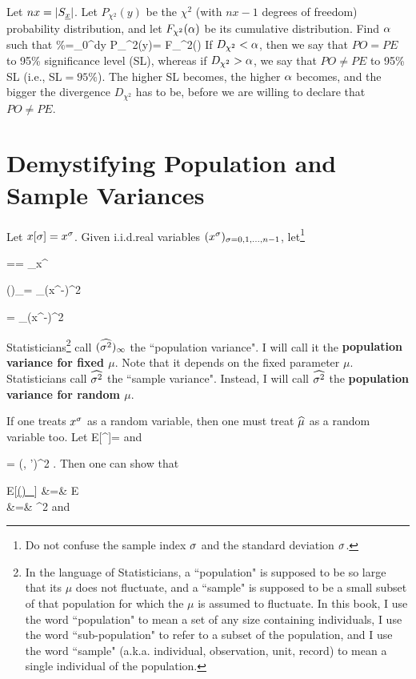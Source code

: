 Let $nx=|S_{\underline{x}}|$.
Let $P_{\chi^2}(y)$
be the $\chi^2$
(with $nx-1$ degrees of freedom)
probability
distribution,
and let $F_{\chi^2}(\alpha)$
be its cumulative
distribution.
Find $\alpha$
such that
\%=\int_{0}^{\alp}dy\; P_{\chi^2}(y)=
F_{\chi^2}(\alp)
\eeq
If $D_{\chi^2}<\alpha$,
then we say that $PO=PE$ to 95\%
significance level (SL),
whereas if
$D_{\chi^2}>\alpha$,
we say that $PO\neq PE$
to 95\% SL (i.e., SL$=95\%$).
The higher SL becomes,
the higher $\alpha$ becomes,
and the bigger the
divergence $D_{\chi^2}$
has to be,
before we are
willing to declare that $PO\neq PE$.

\section{Demystifying Population
and Sample Variances}
Let $x[\sigma]=x^\sigma$.
Given  i.i.d.real  variables
$(x^\sigma)_{\sigma=0,1, \ldots, n-1}$,
let\footnote{Do not confuse the sample
index $\sigma$ and the standard deviation
$\sigma$.}

\beq
\HAT{\mu}==
\sum_\s x^\s
\;
\eeq

\beq
(\hatvar)_\infty=
\sum_\s (x^\s-\mu)^2
\eeq

\beq
\hatvar=
\sum_\s (x^\s-\HAT{\mu})^2
\eeq

Statisticians\footnote{
In the language of Statisticians,
 a ``population"
is supposed to be
so large that its $\mu$
does not fluctuate,
and a ``sample" is
supposed to be a small
subset of that population
for which the $\mu$
is assumed to fluctuate.
In this book, I
use the word ``population"
to mean a set of any size
containing individuals, I use
the word ``sub-population"
to refer to a subset
of the population,
and I use the
word ``sample"
(a.k.a. individual, observation, unit,
record)  to mean a
single individual
of the population.} call
$(\widehat{\sigma^2})_\infty$ the
``population variance". I will
call it the {\bf population
variance for fixed $\mu$}.
Note that it depends
on
the fixed parameter $\mu$.
Statisticians   call
$\widehat{\sigma^2}$ the
``sample variance".
Instead,
 I will
call $\widehat{\sigma^2}$ the {\bf
population
variance for random $\mu$}.

If one treats $x^\sigma$ as a random
variable, then one must treat
$\widehat{\mu}$
as a random variable too.
Let
\beq
E[\rvx^\s]=\mu
\eeq
and

\beq
{}=
\delta(\s, \s')\s^2
\;.
\eeq
Then one can show that

\beqa
E[\ul{(\hatvar)_\infty}]
&=&
E\left[
\sum_\s (\rvx^\s-\mu)^2
\right]
\\
&=&
\s^2
\eeqa
and

